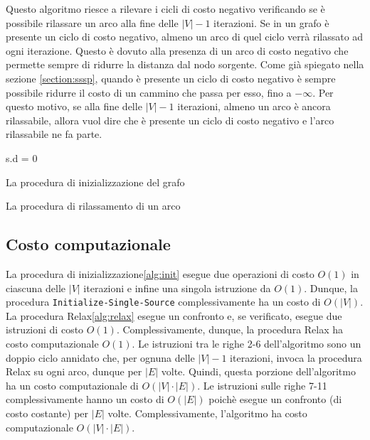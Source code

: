 \documentclass[a4paper]{article}
\begin{document}
	Questo algoritmo riesce a rilevare i cicli di costo negativo verificando se è possibile rilassare un arco alla fine delle $|V|-1$ iterazioni. Se in un grafo è presente un ciclo di costo negativo, almeno un arco di quel ciclo verrà rilassato ad ogni iterazione. Questo è dovuto alla presenza di un arco di costo negativo che permette sempre di ridurre la distanza dal nodo sorgente. Come già spiegato nella sezione \ref{section:sssp}, quando è presente un ciclo di costo negativo è sempre possibile ridurre il costo di un cammino che passa per esso, fino a $-\infty$. Per questo motivo, se alla fine delle $|V|-1$ iterazioni, almeno un arco è ancora rilassabile, allora vuol dire che è presente un ciclo di costo negativo e l'arco rilassabile ne fa parte.

	\begin{algorithm}[H]
		\label{alg:init}
		s.d = 0\;
		\caption{La procedura di inizializzazione del grafo}
	\end{algorithm}

	\begin{algorithm}[H]
		\label{alg:relax}
		\caption{La procedura di rilassamento di un arco}
	\end{algorithm}

	\subsection{Costo computazionale}
	La procedura di inizializzazione\ref{alg:init} esegue due operazioni di costo $O(1)$ in ciascuna delle $|V|$ iterazioni e infine una singola istruzione da $O(1)$. Dunque, la procedura \texttt{Initialize-Single-Source} complessivamente ha un costo di $O(|V|)$. La procedura Relax\ref{alg:relax} esegue un confronto e, se verificato, esegue due istruzioni di costo $O(1)$. Complessivamente, dunque, la procedura Relax ha costo computazionale $O(1)$. Le istruzioni tra le righe 2-6 dell'algoritmo sono un doppio ciclo annidato che, per ognuna delle $|V|-1$ iterazioni, invoca la procedura Relax su ogni arco, dunque per $|E|$ volte. Quindi, questa porzione dell'algoritmo ha un costo computazionale di $O(|V|\cdot |E|)$. Le istruzioni sulle righe 7-11 complessivamente hanno un costo di $O(|E|)$ poichè esegue un confronto (di costo costante) per $|E|$ volte. Complessivamente, l'algoritmo ha costo computazionale $O(|V|\cdot |E|)$.
	
\end{document}
